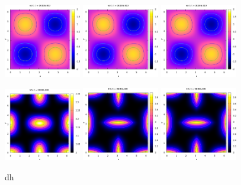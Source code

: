 \documentclass[10pt,twocolumn]{article}
\begin{document}
\begin{figure}
  \centering
  \includegraphics[width=0.3\textwidth]{images/vort_Wi0.3.png}
  \includegraphics[width=0.3\textwidth]{images/vort_Wi0.6.png}
  \includegraphics[width=0.3\textwidth]{images/vort_Wi0.6.png}

  \includegraphics[width=0.3\textwidth]{images/trS_Wi0.3.png}
  \includegraphics[width=0.3\textwidth]{images/trS_Wi0.6.png}
  \includegraphics[width=0.3\textwidth]{images/trS_Wi0.6.png}
  \caption{dh}
  \label{fig:without_diffusion}
\end{figure}
\end{document}
